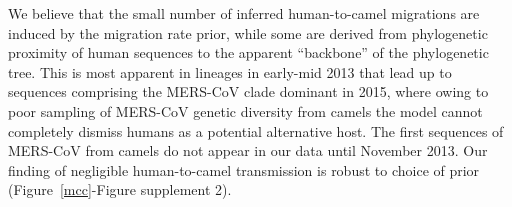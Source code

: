 \documentclass[9pt,lineno]{elife}
\begin{document}
\begin{figure}[h]

\end{figure}


We believe that the small number of inferred human-to-camel migrations are induced by the migration rate prior, while some are derived from phylogenetic proximity of human sequences to the apparent ``backbone'' of the phylogenetic tree.
This is most apparent in lineages in early-mid 2013 that lead up to sequences comprising the MERS-CoV clade dominant in 2015, where owing to poor sampling of MERS-CoV genetic diversity from camels the model cannot completely dismiss humans as a potential alternative host.
The first sequences of MERS-CoV from camels do not appear in our data until November 2013.
Our finding of negligible human-to-camel transmission is robust to choice of prior (Figure~\ref{mcc}-Figure supplement 2).
\end{document}
